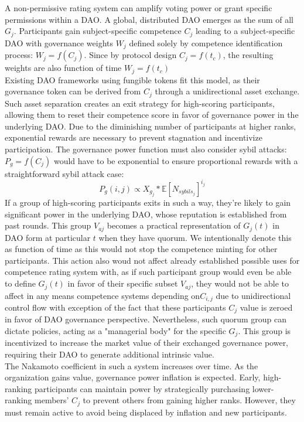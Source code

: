 \documentclass{article}
\begin{document}
\begin{CJK}{UTF8}{gbsn}
\begin{multicols}{2}
            A non-permissive rating system can amplify voting power or grant specific permissions within a DAO. A global, distributed DAO emerges as the sum of all $G_j$. Participants gain subject-specific competence $C_{j}$ leading to a subject-specific DAO with governance weights $W_j$ defined solely by competence identification process: $W_j = f(C_{j})$. Since by protocol design $C_j=f(t_c)$, the resulting weights are also function of time $W_j=f(t_c)$\\
            Existing DAO frameworks using fungible tokens fit this model, as their governance token can be derived from $C_{j}$ through a unidirectional asset exchange. Such asset separation creates an exit strategy for high-scoring participants, allowing them to reset their competence score in favor of governance power in the underlying DAO.
            Due to the diminishing number of participants at higher ranks, exponential rewards are necessary to prevent stagnation and incentivize participation. The governance power function must also consider sybil attacks: $P_g = f(C_{j})$ would have to be exponential to ensure proportional rewards with a straightforward sybil attack case: $$P_g(i,j) \propto  X_{g_j}*\mathbb{E}[N_{sybils_j}]^{i_j}$$
            If a group of high-scoring participants exits in such a way, they're likely to gain significant power in the underlying DAO, whose reputation is established from past rounds. This group $V_{aj}$ becomes a practical representation of $G_j(t)$ in DAO form at particular $t$ when they have quorum. We intentionally denote this as function of time as this would not stop the competence minting for other participants. This action also woud not affect already established possible uses for competence rating system with, as if such participant group would even be able to define $G_j(t)$ in favor of their specific subset $V_{aj}$, they would not be able to affect in any means competence systems depending on$C _{i,j}$ due to unidirectional control flow with exception of the fact that these participants $C_{j}$ value is zeroed in favor of DAO governance perspective.
            Nevertheless, such quorum group can dictate policies, acting as a "managerial body" for the specific $G_j$. This group is incentivized to increase the market value of their exchanged governance power, requiring their DAO to generate additional intrinsic value. \\
            The Nakamoto coefficient in such a system increases over time. As the organization gains value, governance power inflation is expected. Early, high-ranking participants can maintain power by strategically purchasing lower-ranking members' $C_{j}$ to prevent others from gaining higher ranks. However, they must remain active to avoid being displaced by inflation and new participants.


\end{multicols}
\end{CJK}
\end{document}
